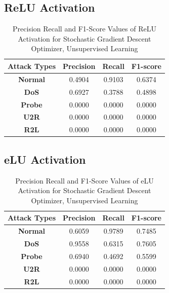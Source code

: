 \documentclass[12pt, a4paper]{report}
\begin{document}
\begin{appendices}
  
  \subsection{ReLU Activation}
  \begin{table}[h]
		\centering
		\captionsetup{justification=centering,margin=2cm}
		\begin{tabular}{|c|c|c|c|}
		\hline
		\textbf{Attack Types} & \textbf{Precision} & \textbf{Recall} & \textbf{F1-score} \\ \hline
		\textbf{Normal}       & 0.4904             & 0.9103          & 0.6374            \\ \hline
		\textbf{DoS}          & 0.6927             & 0.3788          & 0.4898            \\ \hline
		\textbf{Probe}        & 0.0000             & 0.0000          & 0.0000            \\ \hline
		\textbf{U2R}          & 0.0000             & 0.0000          & 0.0000            \\ \hline
		\textbf{R2L}          & 0.0000             & 0.0000          & 0.0000            \\ \hline
		\end{tabular}
		\caption{Precision Recall and F1-Score Values of ReLU Activation for Stochastic Gradient Descent Optimizer, Unsupervised Learning}
		\label{classification ReLU sgd tf}
		\end{table} 

   \subsection{eLU Activation}
  \begin{table}[h]
		\centering
		\captionsetup{justification=centering,margin=2cm}
		\begin{tabular}{|c|c|c|c|}
		\hline
		\textbf{Attack Types} & \textbf{Precision} & \textbf{Recall} & \textbf{F1-score} \\ \hline
		\textbf{Normal}       & 0.6059             & 0.9789          & 0.7485            \\ \hline
		\textbf{DoS}          & 0.9558             & 0.6315          & 0.7605            \\ \hline
		\textbf{Probe}        & 0.6940             & 0.4692          & 0.5599            \\ \hline
		\textbf{U2R}          & 0.0000             & 0.0000          & 0.0000            \\ \hline
		\textbf{R2L}          & 0.0000             & 0.0000          & 0.0000            \\ \hline
		\end{tabular}
		\caption{Precision Recall and F1-Score Values of eLU Activation for Stochastic Gradient Descent Optimizer, Unsupervised Learning}
		\label{classification eLU sgd tf}
		\end{table} 
  \clearpage

\end{appendices}
\end{document}

